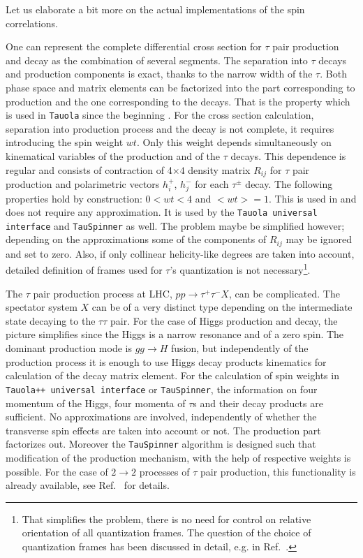 \documentclass[12pt]{article}
\begin{document}
Let us elaborate a bit more on the actual implementations of the spin correlations.


One can represent the complete  differential cross section for 
$\tau$ pair production and decay as the combination of several segments. 
The separation into $\tau$ decays and production components is exact, thanks to the narrow width of the $\tau$.
Both phase space and matrix elements can be factorized into the part corresponding to production and the 
one corresponding to the decays. 
That is the property which is used in {\tt Tauola} since the beginning \cite{Jadach:1990mz}. For the
cross section calculation, separation into  production process and the decay is not complete, it requires introducing 
the spin weight $wt$. Only this weight depends simultaneously on kinematical
variables of the production and of the $\tau$ decays.  This dependence is regular and consists of 
contraction of 4$\times4$ density matrix $R_{ij}$ for $\tau$ pair production and polarimetric 
vectors $h_i^+$, $h_j^-$ for each $\tau^\pm$ decay. The following properties hold by construction:  $0<wt<4$  and  $<wt>=1$.
This is  used in 
\cite{Jadach:1999vf,Jadach:1993yv} and does not require any approximation. It is used by the
{\tt Tauola universal interface} and {\tt TauSpinner} as well. 
The problem maybe be simplified however; depending on the approximations some 
of the components of $R_{ij}$ may be ignored and set to zero. Also, if only collinear helicity-like degrees are 
taken into account, detailed definition of frames used for $\tau$'s quantization is not necessary\footnote{
That simplifies the problem, there is no need for control on relative orientation of all quantization frames. 
The question of the choice of quantization frames  has been discussed in detail, e.g. in  Ref.~\cite{Jadach:1998wp}. }.

The $\tau$ pair production process at LHC, $pp \to \tau^+\tau^- X$, can be complicated. The spectator system $X$ 
can be of a very distinct type depending on the intermediate state decaying to 
the $  \tau \tau$ pair. 
For the case of Higgs production and decay, the picture simplifies since the
Higgs is a narrow resonance and of a zero spin. The dominant production mode is $gg \to H$ fusion,
but independently of the production process it is enough to use Higgs decay products kinematics for calculation
of the decay matrix element. 
For the calculation of spin  weights in {\tt Tauola++ universal interface} or {\tt TauSpinner},
the information on four momentum of the Higgs, four momenta of $\tau$s and their decay products are sufficient. 
No approximations are involved,
independently of whether the transverse spin effects are taken  into account or not.
The production part factorizes out. Moreover the {\tt TauSpinner} algorithm is designed such that modification of the  
production mechanism, with the help of respective weights is possible. 
For the case of $2 \to 2$ processes of $\tau$ pair production,  this functionality 
is already available, see Ref.~\cite{Banerjee:2012ez} for details.
\end{document}
